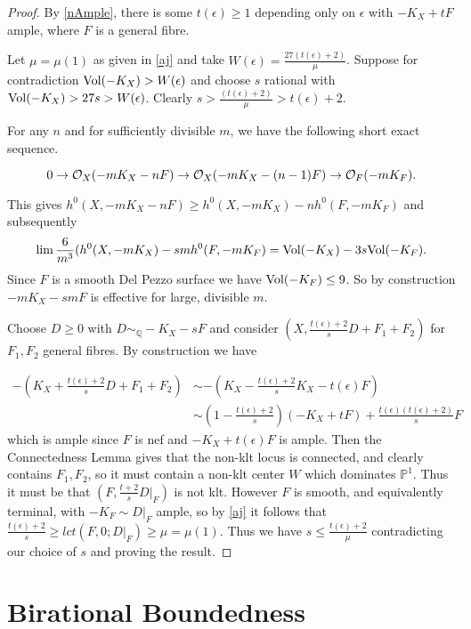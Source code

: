 \begin{proof}
	By \autoref{nAmple}, there is some $t(\epsilon)\geq 1$ depending only on $\epsilon$ with $-K_{X}+tF$ ample, where $F$ is a general fibre.
	
	Let $\mu=\mu(1)$ as given in \autoref{aj} and take $W(\epsilon)= \frac{27(t(\epsilon)+2)}{\mu}$. Suppose for contradiction $\text{Vol}(-K_{X}) > W(\epsilon)$ and choose $s$ rational with $\text{Vol}(-K_{X}) > 27s > W(\epsilon)$. Clearly $s > \frac{(t(\epsilon)+2)}{\mu} > t(\epsilon)+2$. 
	
	For any $n$ and for sufficiently divisible $m$, we have the following short exact sequence.
	
	\[0 \to \mathcal{O}_{X} (-mK_{X}-nF) \to \mathcal{O}_{X}(-mK_{X}-(n-1)F) \to \mathcal{O}_{F}(-mK_{F}).\]
	
	This gives $h^{0}(X,-mK_{X}-nF) \geq h^{0}(X,-mK_{X})-nh^{0}(F,-mK_{F})$ and subsequently 
	\[\lim \frac{6}{m^{3}}(h^{0}(X,-mK_{X})-smh^{0}(F,-mK_{F})= \text{Vol}(-K_{X})-3s\text{Vol}(-K_{F}).\] Since $F$ is a smooth Del Pezzo surface we have $\text{Vol}(-K_{F})\leq 9$.  So by construction $-mK_{X}-smF$ is effective for large, divisible $m$. 
	
	Choose $D\geq 0$ with $D \sim_{\mathbb{Q}} -K_{X}-sF$ and consider $(X,\frac{t(\epsilon)+2}{s}D+F_{1}+F_{2})$ for $F_{1},F_{2}$ general fibres. By construction we have
	
	\begin{align*}
	-(K_{X}+\frac{t(\epsilon)+2}{s}D+F_{1}+F_{2})&\sim -(K_{X}-\frac{t(\epsilon)+2}{s}K_{X}-t(\epsilon)F)\\
	&\sim (1-\frac{t(\epsilon)+2}{s})(-K_{X}+tF) + \frac{t(\epsilon)(t(\epsilon)+2)}{s}F
	\end{align*}
	which is ample since $F$ is nef and $-K_{X}+t(\epsilon)F$ is ample.
	Then the Connectedness Lemma gives that the non-klt locus is connected, and clearly contains $F_{1},F_{2}$, so it must contain a non-klt center $W$ which dominates $\mathbb{P}^{1}$. Thus it must be that $(F,\frac{t+2}{s}D|_{F})$ is not klt. However $F$ is smooth, and equivalently terminal, with $-K_{F}\sim D|_{F}$ ample, so by \autoref{aj} it follows that $\frac{t(\epsilon)+2}{s} \geq lct(F,0;D|_{F}) \geq \mu=\mu(1)$. Thus we have $s \leq \frac{t(\epsilon)+2}{\mu}$ contradicting our choice of $s$ and proving the result.
\end{proof}


\section{Birational Boundedness}

